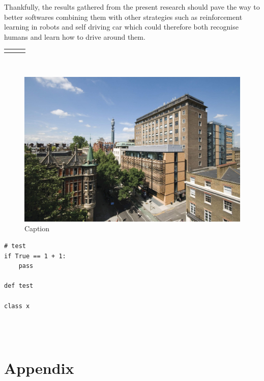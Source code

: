 \documentclass[a4paper,12pt,twoside,twocolumn]{article}
\begin{document}
Thankfully, the results gathered from the present research should pave the way to better softwares combining them with other strategies such as reinforcement learning in robots and self driving car which could therefore both recognise humans and learn how to drive around them.\\

\begin{center}
\begin{tabular}{lll}
\hline
 &  & \\
\hline
 &  & \\
\hline
\end{tabular}
\end{center}

\pagebreak\\

\begin{figure}[htbp]
\centering
\includegraphics[width=.9\linewidth]{./images/Roberts_building.jpg}
\caption{Caption}
\end{figure}

\lstset{language=Python,label= ,caption= ,captionpos=b,numbers=none}
\begin{lstlisting}
# test
if True == 1 + 1:
    pass

def test

class x
\end{lstlisting}

\vfill \pagebreak \printbibliography\\


\pagebreak\\

\section{Appendix}
\label{sec:org6977499}
\end{document}
